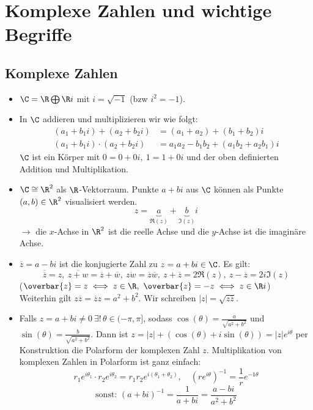 \chapter[Einführung]{Komplexe Zahlen und wichtige Begriffe}\lecture

\section{Komplexe Zahlen}

\begin{itemize}
	\item $ \C = \R \bigoplus \R i $ mit $ i = \sqrt{-1} $ (bzw $ i^2 = -1 $). 
	
	\item In $\C$ addieren und multiplizieren wir wie folgt:
	\begin{align*}
	(a_1 + b_1i) + (a_2 + b_2i) &= (a_1 + a_2) + (b_1 + b_2)i\\
	(a_1 + b_1i) \cdot (a_2 + b_2i) &= a_1a_2 - b_1b_2 + (a_1b_2 + a_2b_1)i
	\end{align*}
	$\C$ ist ein Körper mit $ 0 = 0+0i,\ 1 = 1+0i $ und der oben definierten Addition und Multiplikation.
	
	\item $ \C \cong \R^2 $ als $\R$-Vektorraum. Punkte $ a+bi $ aus $\C$ können als Punkte $ (a,b) \in \R^2 $ visualisiert werden.
	\[ z= \underbrace{a}_{\Re(z)} + \underbrace{b}_{\Im(z)}i \]
	$ \rightarrow $ die $x$-Achse in $\R^2$ ist die reelle Achse und die $y$-Achse ist die imaginäre Achse.
	
	\item $ \overbar{z} = a-bi $ ist die konjugierte Zahl zu $ z = a+bi \in \C $. Es gilt:
	\[ \overbar{\overbar{z}} = z,\ \overbar{z+w} = \overbar{z} + \overbar{w},\ \overbar{zw} = \overbar{z} \overbar{w},\ z + \overbar{z} = 2\Re(z),\ z - \overbar{z} = 2i\Im(z) \]
	($ \overbar{z} = z \iff z \in \R,\ \overbar{z} = -z \iff z \in \R i $)\\
	Weiterhin gilt $ z \overbar{z} = \overbar{z} z = a^2 + b^2 $. Wir schreiben $ |z| = \sqrt{z \overbar{z}} $.
	
	\item Falls $ z = a+bi \neq 0\ \exists!\, \theta \in (-\pi,\pi] $, sodass $ \cos(\theta) = \frac{a}{\sqrt{a^2+b^2}} $ und $ \sin(\theta) = \frac{b}{\sqrt{a^2+b^2}}. $ Dann ist $ z = |z| + (\cos(\theta) + i\sin(\theta)) = |z| e^{i \theta} $ per Konstruktion die Polarform der komplexen Zahl $z$. Multiplikation von komplexen Zahlen in Polarform ist ganz einfach:
	\[ r_1 e^{i\theta_1} \cdot r_2 e^{i\theta_2} = r_1r_2 e^{i(\theta_1 + \theta_2)},\quad \left( re^{i\theta} \right)^{-1} = \frac{1}{r} e^{-1\theta} \]
	\[ \text{sonst: } (a+bi)^{-1} = \frac{1}{a+bi} = \frac{a-bi}{a^2+b^2} \]
	

\end{itemize}
